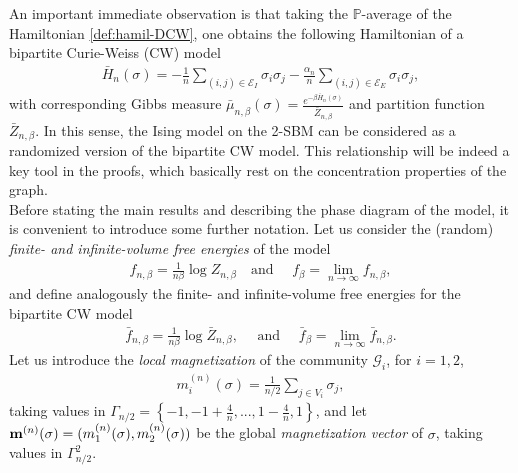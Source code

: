 \documentclass[11pt,oneside]{amsart}
\numberwithin{equation}{section}  %
\theoremstyle{plain}
\theoremstyle{remark}
\def \cE {\mathcal{E}}
\def \s {{\sigma}}
\def \bm {{\bf m}}
\begin{document}
An important immediate observation is that taking the $\mathbb{P}$-average of the Hamiltonian \eqref{def:hamil-DCW}, one obtains the following Hamiltonian of a bipartite Curie-Weiss (CW) model
\begin{align}\label{def:hamiltonian_CW}
    \bar{H}_{n}(\sigma)=-\frac{1}{n}\sum_{(i, j) \in\cE_I} \sigma_i \sigma_j -\frac{\alpha_n}{n} \sum_{(i, j) \in\cE_E}\sigma_i \sigma_j,
\end{align}
with corresponding Gibbs measure $ \bar{\mu}_{n,\beta}(\sigma)=\frac{e^{-\beta \bar{H}_n(\sigma)}}{\bar{Z}_{n,\beta}}$ and partition function $\bar{Z}_{n,\beta}$.
In this sense, the Ising model on the 2-SBM can be considered
as a randomized version of the bipartite CW model. This relationship will be indeed a key tool in the proofs, which basically rest on the concentration properties of the graph.\\

Before stating the main results and describing the phase diagram of the model, it is convenient to introduce some further notation. Let us consider the (random) \textit{finite- and infinite-volume free energies} of the model
\begin{align}\label{free_energy}
    f_{n,\beta}=\frac{1}{ n \beta} \log Z_{n,\beta} \quad \mbox{and } \quad     f_{\beta}=\lim_{n\to\infty}f_{n,\beta} ,
\end{align}
and define analogously the finite- and infinite-volume free energies for the bipartite CW model
\begin{align}\label{free_energy_CW}
    \bar{f}_{n,\beta}=\frac{1}{n \beta} \log \bar{Z}_{n,\beta},\quad \mbox{ and } \quad
    \bar{f}_{\beta}=\lim_{n \to \infty} \bar{f}_{n,\beta}.
\end{align}
Let us introduce the \textit{local magnetization}
of the community $\mathscr{G}_i$, for $i=1,2$,
\begin{align*}
    m_i^{(n)} (\sigma)= \frac{1}{n/2} \sum_{j \in V_i} \sigma_j,
\end{align*}
taking values in $\Gamma_{n/2}=\left \{ -1, -1+\frac{4}{n},...,1-\frac{4}{n}, 1 \right \}$, 
and let $\bm^{(n)}(\s)=(m_1^{(n)}(\s),m_2^{(n)}(\s))$ be the global \textit{magnetization vector} of $\s$,
taking values in $\Gamma_{n/2}^2$. 
\end{document}
